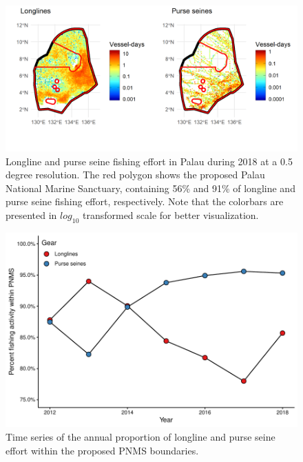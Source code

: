 \documentclass[12pt]{article}
\begin{document}
\begin{figure}
\centering
\includegraphics{img/plw_2018.png}
\caption{\label{fig:plw_2018}Longline and purse seine fishing effort in Palau during 2018 at a 0.5 degree resolution. The red polygon shows the proposed Palau National Marine Sanctuary, containing 56\% and 91\% of longline and purse seine fishing effort, respectively. Note that the colorbars are presented in $log_{10}$ transformed scale for better visualization.}
\end{figure}

\begin{figure}
\centering
\includegraphics{img/plw_ts_plot.pdf}
\caption{\label{fig:plw_ts_plot}Time series of the annual proportion of longline and purse seine effort within the proposed PNMS boundaries.}
\end{figure}

\clearpage



\end{document}
